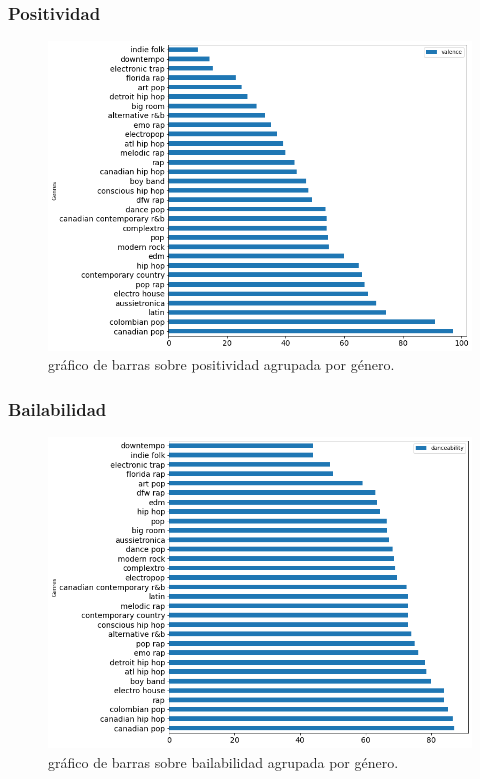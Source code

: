 \documentclass{article}
\begin{document}
\newpage
\subsubsection{Positividad}

\begin{figure}[h]
  \centering
  \includegraphics[scale=0.4]{c}
  \caption{gráfico de barras sobre positividad agrupada por género.}
\end{figure}

\newpage
\subsubsection{Bailabilidad}

\begin{figure}[h]
  \centering
  \includegraphics[scale=0.4]{d}
  \caption{gráfico de barras sobre bailabilidad agrupada por género.}
\end{figure}
\end{document}
